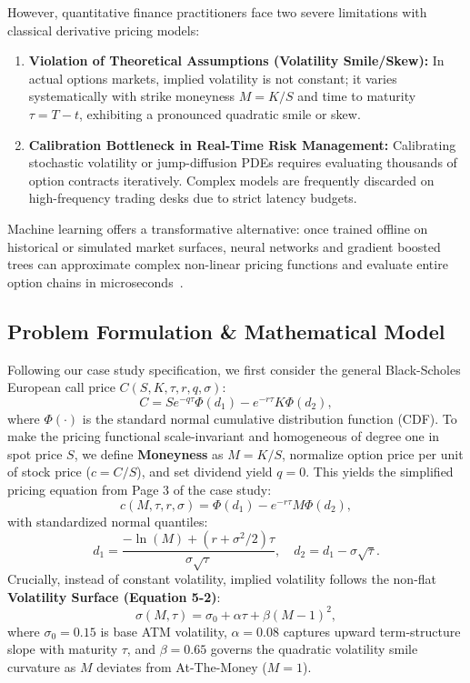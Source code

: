 \documentclass[10pt,twocolumn]{article}
\begin{document}
However, quantitative finance practitioners face two severe limitations with classical derivative pricing models:
\begin{enumerate}
    \item \textbf{Violation of Theoretical Assumptions (Volatility Smile/Skew):} In actual options markets, implied volatility is not constant; it varies systematically with strike moneyness $M = K/S$ and time to maturity $\tau = T - t$, exhibiting a pronounced quadratic smile or skew.
    \item \textbf{Calibration Bottleneck in Real-Time Risk Management:} Calibrating stochastic volatility or jump-diffusion PDEs requires evaluating thousands of option contracts iteratively. Complex models are frequently discarded on high-frequency trading desks due to strict latency budgets.
\end{enumerate}

Machine learning offers a transformative alternative: once trained offline on historical or simulated market surfaces, neural networks and gradient boosted trees can approximate complex non-linear pricing functions and evaluate entire option chains in microseconds~\cite{hutchinson1994nonparametric,horvath2021deep}.

\subsection{Problem Formulation \& Mathematical Model}
Following our case study specification, we first consider the general Black-Scholes European call price $C(S, K, \tau, r, q, \sigma)$:
\begin{equation}
    C = S e^{-q\tau}\Phi(d_1) - e^{-r\tau}K\Phi(d_2),
\end{equation}
where $\Phi(\cdot)$ is the standard normal cumulative distribution function (CDF). To make the pricing functional scale-invariant and homogeneous of degree one in spot price $S$, we define \textbf{Moneyness} as $M = K/S$, normalize option price per unit of stock price ($c = C/S$), and set dividend yield $q = 0$. This yields the simplified pricing equation from Page 3 of the case study:
\begin{equation}
    c(M, \tau, r, \sigma) = \Phi(d_1) - e^{-r\tau}M\Phi(d_2),
    \label{eq:bs_norm}
\end{equation}
with standardized normal quantiles:
\begin{equation}
    d_1 = \frac{-\ln(M) + (r + \sigma^2 / 2)\tau}{\sigma\sqrt{\tau}}, \quad d_2 = d_1 - \sigma\sqrt{\tau}.
\end{equation}
Crucially, instead of constant volatility, implied volatility follows the non-flat \textbf{Volatility Surface (Equation 5-2)}:
\begin{equation}
    \sigma(M, \tau) = \sigma_0 + \alpha\tau + \beta(M - 1)^2,
    \label{eq:vol_smile}
\end{equation}
where $\sigma_0 = 0.15$ is base ATM volatility, $\alpha = 0.08$ captures upward term-structure slope with maturity $\tau$, and $\beta = 0.65$ governs the quadratic volatility smile curvature as $M$ deviates from At-The-Money ($M=1$).
\end{document}
